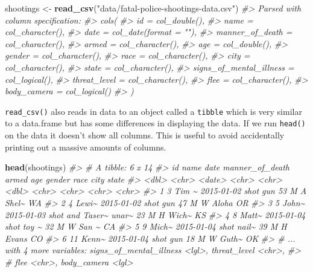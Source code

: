\documentclass[
  12pt,
]{book}
\newenvironment{Shaded}{\begin{snugshade}}{\end{snugshade}}
\newcommand{\CommentTok}[1]{\textcolor[rgb]{0.56,0.35,0.01}{\textit{#1}}}
\newcommand{\KeywordTok}[1]{\textcolor[rgb]{0.13,0.29,0.53}{\textbf{#1}}}
\newcommand{\NormalTok}[1]{#1}
\newcommand{\StringTok}[1]{\textcolor[rgb]{0.31,0.60,0.02}{#1}}
\begin{document}
\begin{Shaded}
\begin{Highlighting}[]
\NormalTok{shootings <{-}}\StringTok{ }\KeywordTok{read\_csv}\NormalTok{(}\StringTok{"data/fatal{-}police{-}shootings{-}data.csv"}\NormalTok{)}
\CommentTok{\#> Parsed with column specification:}
\CommentTok{\#> cols(}
\CommentTok{\#>   id = col\_double(),}
\CommentTok{\#>   name = col\_character(),}
\CommentTok{\#>   date = col\_date(format = ""),}
\CommentTok{\#>   manner\_of\_death = col\_character(),}
\CommentTok{\#>   armed = col\_character(),}
\CommentTok{\#>   age = col\_double(),}
\CommentTok{\#>   gender = col\_character(),}
\CommentTok{\#>   race = col\_character(),}
\CommentTok{\#>   city = col\_character(),}
\CommentTok{\#>   state = col\_character(),}
\CommentTok{\#>   signs\_of\_mental\_illness = col\_logical(),}
\CommentTok{\#>   threat\_level = col\_character(),}
\CommentTok{\#>   flee = col\_character(),}
\CommentTok{\#>   body\_camera = col\_logical()}
\CommentTok{\#> )}
\end{Highlighting}
\end{Shaded}

\texttt{read\_csv()} also reads in data to an object called a \texttt{tibble} which is very similar to a data.frame but has some differences in displaying the data. If we run \texttt{head()} on the data it doesn't show all columns. This is useful to avoid accidentally printing out a massive amounts of columns.

\begin{Shaded}
\begin{Highlighting}[]
\KeywordTok{head}\NormalTok{(shootings)}
\CommentTok{\#> \# A tibble: 6 x 14}
\CommentTok{\#>      id name  date       manner\_of\_death armed   age gender race  city  state}
\CommentTok{\#>   <dbl> <chr> <date>     <chr>           <chr> <dbl> <chr>  <chr> <chr> <chr>}
\CommentTok{\#> 1     3 Tim \textasciitilde{} 2015{-}01{-}02 shot            gun      53 M      A     Shel\textasciitilde{} WA   }
\CommentTok{\#> 2     4 Lewi\textasciitilde{} 2015{-}01{-}02 shot            gun      47 M      W     Aloha OR   }
\CommentTok{\#> 3     5 John\textasciitilde{} 2015{-}01{-}03 shot and Taser\textasciitilde{} unar\textasciitilde{}    23 M      H     Wich\textasciitilde{} KS   }
\CommentTok{\#> 4     8 Matt\textasciitilde{} 2015{-}01{-}04 shot            toy \textasciitilde{}    32 M      W     San \textasciitilde{} CA   }
\CommentTok{\#> 5     9 Mich\textasciitilde{} 2015{-}01{-}04 shot            nail\textasciitilde{}    39 M      H     Evans CO   }
\CommentTok{\#> 6    11 Kenn\textasciitilde{} 2015{-}01{-}04 shot            gun      18 M      W     Guth\textasciitilde{} OK   }
\CommentTok{\#> \# ... with 4 more variables: signs\_of\_mental\_illness <lgl>, threat\_level <chr>,}
\CommentTok{\#> \#   flee <chr>, body\_camera <lgl>}
\end{Highlighting}
\end{Shaded}
\end{document}
